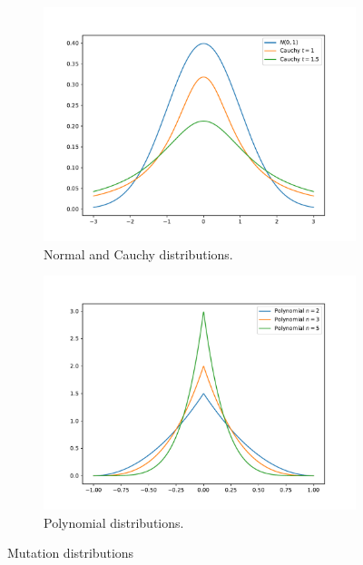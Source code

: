 \begin{figure}
    \begin{subfigure}[t]{0.45\textwidth}
        \includegraphics[width=\textwidth]{img/render_distributions_normalcauchy.pdf}
        \caption{Normal and Cauchy distributions.}
        \label{fig:mutationdistributionnormalcacuchy}
    \end{subfigure}
    \hfill
    \begin{subfigure}[t]{0.45\textwidth}
        \includegraphics[width=\textwidth]{img/render_distributions_polynomial.pdf}
        \caption{Polynomial distributions.}
        \label{fig:mutationdistributionpolynomial}
    \end{subfigure}
    \caption{Mutation distributions}
\end{figure}


